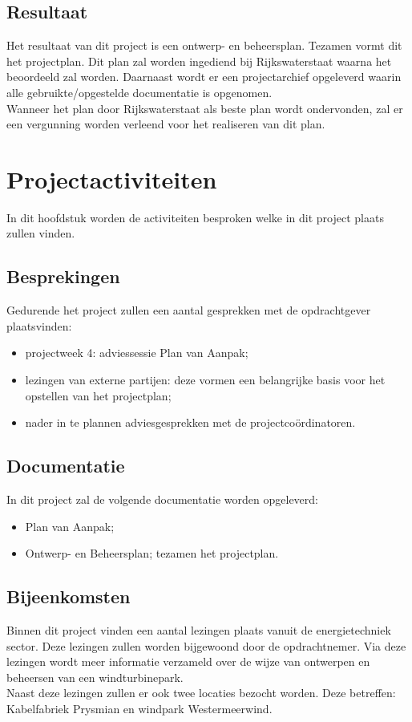 \documentclass[numbers=endperiod]{scrartcl}
\newcommand{\sectionSmall}[1]{
	\vspace{-10pt}
	\section{#1}
	\vspace{-5pt}
}
\newcommand{\whitespace}{\vspace*{2 mm} \\}%
\begin{document}
	\subsection{Resultaat}	
	Het resultaat van dit project is een ontwerp- en beheersplan. Tezamen vormt dit het projectplan. Dit plan zal worden ingediend bij Rijkswaterstaat waarna het beoordeeld zal worden. Daarnaast wordt er een projectarchief opgeleverd waarin alle gebruikte/opgestelde documentatie is opgenomen.
	\whitespace
	Wanneer het plan door Rijkswaterstaat als beste plan wordt ondervonden, zal er een vergunning worden verleend voor het realiseren van dit plan.
	
	\sectionSmall{Projectactiviteiten}
	In dit hoofdstuk worden de activiteiten besproken welke in dit project plaats zullen vinden.
	\subsection{Besprekingen}
	Gedurende het project zullen een aantal gesprekken met de opdrachtgever plaatsvinden:
	\begin{itemize}
		\item projectweek 4: adviessessie Plan van Aanpak;
		\item lezingen van externe partijen: deze vormen een belangrijke basis voor het opstellen van het projectplan;
		\item nader in te plannen adviesgesprekken met de projectcoördinatoren.
	\end{itemize}
	\subsection{Documentatie}
	In dit project zal de volgende documentatie worden opgeleverd:
	\begin{itemize}
		\item Plan van Aanpak;
		\item Ontwerp- en Beheersplan; tezamen het projectplan.
	\end{itemize}
	
	\subsection{Bijeenkomsten}
	Binnen dit project vinden een aantal lezingen plaats vanuit de energietechniek sector. Deze lezingen zullen worden bijgewoond door de opdrachtnemer. Via deze lezingen wordt meer informatie verzameld over de wijze van ontwerpen en beheersen van een windturbinepark.
	\whitespace
	Naast deze lezingen zullen er ook twee locaties bezocht worden. Deze betreffen: Kabelfabriek Prysmian en windpark Westermeerwind.
	
\end{document}
